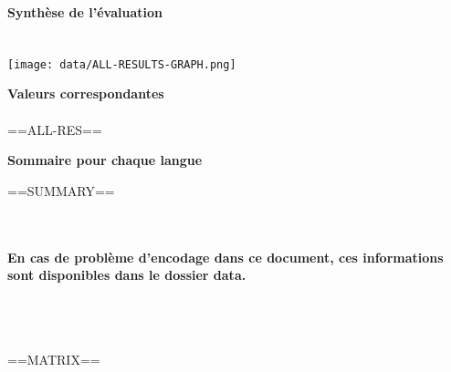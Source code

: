 \documentclass[12pt,a4paper]{article}
\begin{document}
\centering
\vspace{-3cm}
\textbf{\Huge{Synth\`ese de
    l'\'evaluation}\\~\\~\\\normalsize}
\texttt{[image: data/ALL-RESULTS-GRAPH.png]}

\textbf{Valeurs correspondantes}\\~\\

==ALL-RES==

\newpage
\textbf{Sommaire pour chaque langue}

==SUMMARY==

~\\~\\

\textbf{En  cas  de  probl\`{e}me  d'encodage dans  ce  document,  ces
  informations sont disponibles dans le dossier data.} 

~\\~\\~\\

==MATRIX==
\end{document}
